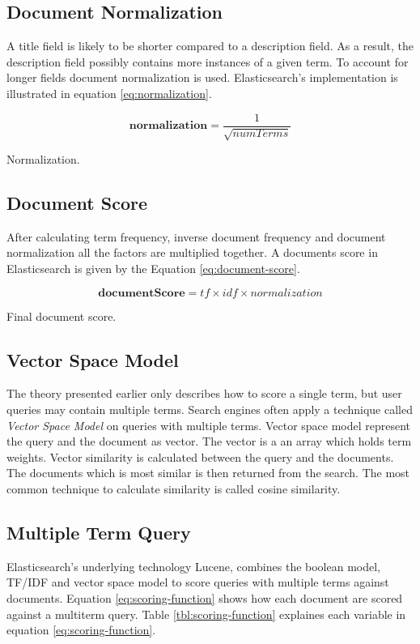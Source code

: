 \subsection{Document Normalization}
A title field is likely to be shorter compared to a description field.
As a result, the description field possibly contains more instances of a given term.
To account for longer fields document normalization is used.
Elasticsearch's implementation is illustrated in equation \ref{eq:normalization}.

\begin{cequation}[H]
	\begin{equation}
		\mathbf{normalization} = \frac{1}{\sqrt{numTerms}}
	\end{equation}
	\caption{Normalization.}
  \label{eq:normalization}
\end{cequation}

\subsection{Document Score}
\label{sec:doc-score}
After calculating term frequency, inverse document frequency and document normalization all the factors are multiplied together.
A documents score in Elasticsearch is given by the Equation \ref{eq:document-score}.

\begin{cequation}[H]
	\begin{equation}
		\mathbf{documentScore} = tf \times idf \times normalization
	\end{equation}
	\caption{Final document score.}
  \label{eq:document-score}
\end{cequation}

\subsection{Vector Space Model}
The theory presented earlier only describes how to score a single term, but user queries may contain multiple terms.
Search engines often apply a technique called \textit{Vector Space Model} on queries with multiple terms.
Vector space model represent the query and the document as vector.
The vector is a an array which holds term weights.
Vector similarity is calculated between the query and the documents.
The documents which is most similar is then returned from the search.
The most common technique to calculate similarity is called cosine similarity.

\subsection{Multiple Term Query}
Elasticsearch's underlying technology Lucene,
combines the boolean model, TF/IDF and vector space model to score queries with multiple terms against documents.
Equation \ref{eq:scoring-function} shows how each document are scored against a multiterm query.
Table \ref{tbl:scoring-function} explaines each variable in equation \ref{eq:scoring-function}.

